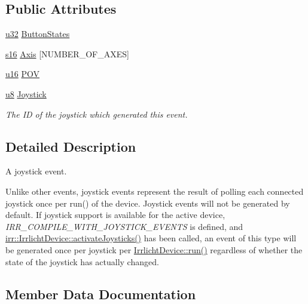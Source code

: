 \subsection*{Public Attributes}
\begin{DoxyCompactItemize}
\item 
\hyperlink{namespaceirr_a0416a53257075833e7002efd0a18e804}{u32} \hyperlink{structirr_1_1SEvent_1_1SJoystickEvent_a4fd74c22d62c1613405dc3191ccc5b7c}{Button\+States}
\item 
\hyperlink{namespaceirr_a43ace0af066371ac0862bac3f7314220}{s16} \hyperlink{structirr_1_1SEvent_1_1SJoystickEvent_a4819a9a5214f8f983ccb13357ab88f59}{Axis} \mbox{[}N\+U\+M\+B\+E\+R\+\_\+\+O\+F\+\_\+\+A\+X\+ES\mbox{]}
\item 
\hyperlink{namespaceirr_ae9f8ec82692ad3b83c21f555bfa70bcc}{u16} \hyperlink{structirr_1_1SEvent_1_1SJoystickEvent_af30285332d154507b9752ffde3f6bf84}{P\+OV}
\item 
\hyperlink{namespaceirr_a646874f69af8ff87fc10201b0254a761}{u8} \hyperlink{structirr_1_1SEvent_1_1SJoystickEvent_a04424b44a1c3370263afb3af501cae44}{Joystick}
\begin{DoxyCompactList}\small\item\em The ID of the joystick which generated this event. \end{DoxyCompactList}\end{DoxyCompactItemize}


\subsection{Detailed Description}
A joystick event. 

Unlike other events, joystick events represent the result of polling each connected joystick once per run() of the device. Joystick events will not be generated by default. If joystick support is available for the active device, {\itshape I\+R\+R\+\_\+\+C\+O\+M\+P\+I\+L\+E\+\_\+\+W\+I\+T\+H\+\_\+\+J\+O\+Y\+S\+T\+I\+C\+K\+\_\+\+E\+V\+E\+N\+TS} is defined, and \hyperlink{classirr_1_1IrrlichtDevice_af06f8d2c4fdffd1f879e46685bcbc6e3}{irr\+::\+Irrlicht\+Device\+::activate\+Joysticks()} has been called, an event of this type will be generated once per joystick per \hyperlink{classirr_1_1IrrlichtDevice_a0489f8151dc43f6f41503ffb5a160b35}{Irrlicht\+Device\+::run()} regardless of whether the state of the joystick has actually changed. 

\subsection{Member Data Documentation}
\mbox{\label{structirr_1_1SEvent_1_1SJoystickEvent_a4819a9a5214f8f983ccb13357ab88f59}} 
